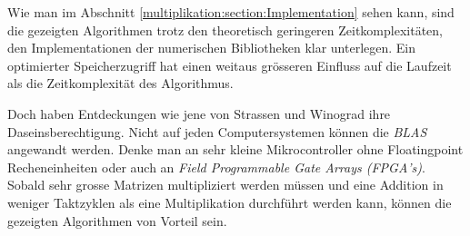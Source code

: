 Wie man im Abschnitt \ref{multiplikation:section:Implementation} sehen kann, sind die gezeigten Algorithmen trotz den theoretisch geringeren Zeitkomplexitäten, den Implementationen der numerischen Bibliotheken klar unterlegen.
Ein optimierter Speicherzugriff hat einen weitaus grösseren Einfluss auf die Laufzeit als die Zeitkomplexität des Algorithmus.

Doch haben Entdeckungen wie jene von Strassen und Winograd ihre Daseinsberechtigung.
Nicht auf jeden Computersystemen können die \textit{BLAS} angewandt werden.
Denke man an sehr kleine Mikrocontroller ohne Floatingpoint Recheneinheiten oder auch an \textit{Field Programmable Gate Arrays (FPGA's)}.
Sobald sehr grosse Matrizen multipliziert werden müssen und eine Addition in weniger Taktzyklen als eine Multiplikation durchführt werden kann, können die gezeigten Algorithmen von Vorteil sein.
